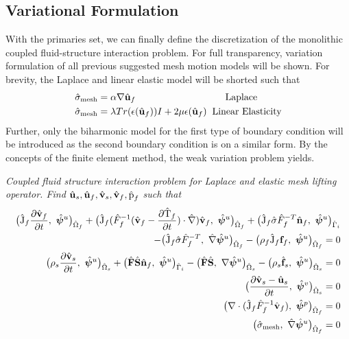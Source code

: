 \subsection{Variational Formulation}
With the primaries set, we can finally define the discretization of the monolithic coupled fluid-structure interaction problem. For full transparency, variation formulation of all previous suggested mesh motion models will be shown. For brevity, the Laplace and linear elastic model will be shorted such that 
\begin{align*}
&\hat{\sigma}_{\text{mesh}} = \alpha \nabla \bat{u}_f \hspace{33mm} \text{Laplace} \\
&\hat{\sigma}_{\text{mesh}} =  \lambda Tr(\epsilon(\bat{u}_f)) I + 2 \mu \epsilon(\bat{u}_f) \hspace{2mm} \text{Linear Elasticity} 
\end{align*}
Further, only the biharmonic model for the first type of boundary condition will be introduced as the second boundary condition is on a similar form.
 By the concepts of the finite element method, the weak variation problem yields.
\begin{prob}
\textit{Coupled fluid structure interaction problem for Laplace and elastic mesh lifting operator.
Find $\hat{\mathbf{u}}_s, \hat{\mathbf{u}}_f, \hat{\mathbf{v}}_s, \hat{\mathbf{v}}_f, \text{\^{p}}_f $ such that}
\begin{align*}
\big(\text{\^{J}}_f \frac{\partial \hat{\mathbf{v}}_f}{\partial t}, \ \hat{\bm{\psi}}^u \big)_{\hat{\Omega}_f} +
\big(\text{\^{J}}_f (\hat{F}_f^{-1}(\hat{\mathbf{v}}_f - \frac{\partial \text{\^{T}}_f}{\partial t}) \cdot \hat{\nabla}) \hat{\mathbf{v}}_f, \ {\hat{\bm{\psi}}^u} \big)_{\hat{\Omega}_f}
+ \big(\text{\^{J}}_f \hat{\sigma}\hat{F}_f^{-T} \hat{\mathbf{n}}_f, \ {\hat{\bm{\psi}}^u} \big)_{\hat{\Gamma}_i} \\
- \big(\text{\^{J}}_f \hat{\sigma}\hat{F}_f^{-T}, \ {\hat{\nabla}\hat{\bm{\psi}}^u} \big)_{\hat{\Omega}_f} -
\big(\rho_f \text{\^{J}}_f \mathbf{f}_f, \ {{\hat{\bm{\psi}}^u}} \big)_{\hat{\Omega}_f} = 0 \\
\big(\rho_s \frac{\partial \hat{\mathbf{v}}_s}{\partial t}, \ {\hat{\bm{\psi}}^u} \big)_{\hat{\Omega}_s} + \big(\hat{\mathbf{F}}\hat{\mathbf{S}}\hat{\mathbf{n}}_f, \ {\hat{\bm{\psi}}^u} \big)_{\hat{\Gamma}_i}
- \big(\hat{\mathbf{F}}\hat{\mathbf{S}}, \ {\nabla \hat{\bm{\psi}}^u} \big)_{\hat{\Omega}_s} - \big(\rho_s \hat{\mathbf{f}}_s, \ {\hat{\bm{\psi}}^u} \big)_{\hat{\Omega}_s} = 0 \\
\big(\frac{\partial \hat{\mathbf{v}}_s - \hat{\mathbf{u}}_s}{\partial t}, \ {\hat{\bm{\psi}}^v} \big)_{\hat{\Omega}_s}  = 0\\
\big(\nabla \cdot (\text{\^{J}}_f \hat{F}_f^{-1} \hat{\mathbf{v}}_f), \ {\hat{\bm{\psi}}^p} \big)_{\hat{\Omega}_f} = 0 \\
\big(\hat{\sigma}_{\text{mesh}}, \ {\hat{\nabla}\hat{\bm{\psi}}^u} \big)_{\hat{\Omega}_f} = 0
\end{align*} 
\end{prob}
